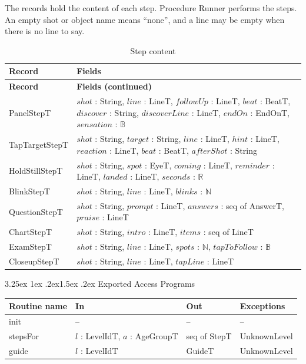 \documentclass[10pt, titlepage]{article}
\makeatletter
\renewcommand\paragraph{\@startsection{paragraph}{4}{\z@}%
  {3.25ex \@plus 1ex \@minus .2ex}{1.5ex \@plus .2ex}%
  {\normalfont\normalsize\bfseries}}
\newcommand{\B}{\mathbb{B}}
\newcommand{\N}{\mathbb{N}}
\newcommand{\R}{\mathbb{R}}
\newcommand{\T}[1]{\mathit{#1}}          %
\newenvironment{accessprogs}{%
  \begin{center}\small
  \begin{tabular}{>{\raggedright\arraybackslash}p{3.0cm}
    >{\raggedright\arraybackslash}p{5.0cm}
    >{\raggedright\arraybackslash}p{2.8cm}
    >{\raggedright\arraybackslash}p{3.4cm}}
  \toprule
  \textbf{Routine name} & \textbf{In} & \textbf{Out} & \textbf{Exceptions}\\
  \midrule}{%
  \bottomrule
  \end{tabular}
  \end{center}}
\makeatother
\begin{document}
The records hold the content of each step. Procedure Runner
performs the steps. An empty shot or object name means ``none'', and a
line may be empty when there is no line to say.

\begingroup
\small
\renewcommand{\arraystretch}{1.2}
\begin{longtable}{@{}p{}p{}@{}}
\caption{Step content}\label{TblStepContent}\\
\toprule
\textbf{Record} & \textbf{Fields}\\
\midrule
\endfirsthead
\toprule
\textbf{Record} & \textbf{Fields (continued)}\\
\midrule
\endhead
\bottomrule
\endfoot
PanelStepT & $\T{shot}$ : String, $\T{line}$ : LineT,
$\T{followUp}$ : LineT, $\T{beat}$ : BeatT,
$\T{discover}$ : String, $\T{discoverLine}$ : LineT,
$\T{endOn}$ : EndOnT, $\T{sensation}$ : $\B$\\[0.4em]
TapTargetStepT & $\T{shot}$ : String, $\T{target}$ : String,
$\T{line}$ : LineT, $\T{hint}$ : LineT, $\T{reaction}$ : LineT,
$\T{beat}$ : BeatT, $\T{afterShot}$ : String\\[0.4em]
HoldStillStepT & $\T{shot}$ : String, $\T{spot}$ : EyeT,
$\T{coming}$ : LineT, $\T{reminder}$ : LineT,
$\T{landed}$ : LineT, $\T{seconds}$ : $\R$\\[0.4em]
BlinkStepT & $\T{shot}$ : String, $\T{line}$ : LineT,
$\T{blinks}$ : $\N$\\[0.4em]
QuestionStepT & $\T{shot}$ : String, $\T{prompt}$ : LineT,
$\T{answers}$ : seq of AnswerT, $\T{praise}$ : LineT\\[0.4em]
ChartStepT & $\T{shot}$ : String, $\T{intro}$ : LineT,
$\T{items}$ : seq of LineT\\[0.4em]
ExamStepT & $\T{shot}$ : String, $\T{line}$ : LineT,
$\T{spots}$ : $\N$, $\T{tapToFollow}$ : $\B$\\[0.4em]
CloseupStepT & $\T{shot}$ : String, $\T{line}$ : LineT,
$\T{tapLine}$ : LineT\\
\end{longtable}
\endgroup

\paragraph{Exported Access Programs}

\begin{accessprogs}
init & -- & -- & --\\
stepsFor & $l$ : LevelIdT, $a$ : AgeGroupT & seq of StepT & UnknownLevel\\
guide & $l$ : LevelIdT & GuideT & UnknownLevel\\
\end{accessprogs}
\end{document}
